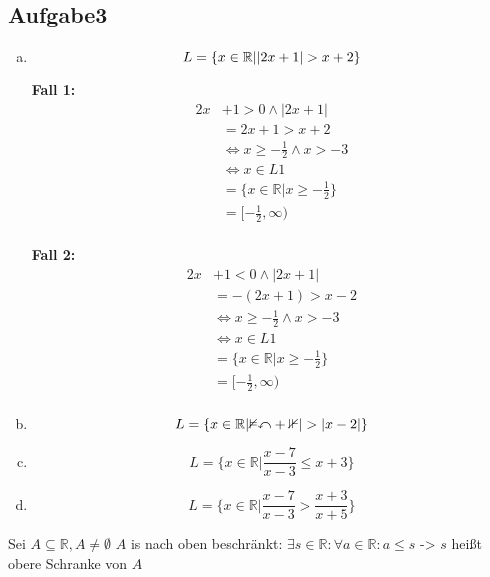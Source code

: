 \documentclass{article}
\begin{document}
\subsection*{Aufgabe3}

\begin{enumerate}[a)]
\item
  \[
    L = \{ x \in \mathbb{R} | \abs{2x + 1} > x + 2\}
  \]

  \begin{minipage}{.4\textwidth}
    \textbf{Fall 1:} \\
    \begin{align*}
      2x &+ 1 > 0 \land |2x+1|\\
         &= 2x+1 > x+2 \\
         &\iff x \geq -\frac{1}{2} \land x > -3 \\
         &\iff x \in L1 \\
         &= \{ x \in \mathbb{R} | x \geq -\frac{1}{2} \} \\
         &= [-\frac{1}{2}, \infty) \\
    \end{align*}
  \end{minipage}
  \hfill
  \vrule
  \hfill
  \begin{minipage}{.4\textwidth}
    \textbf{Fall 2:} \\
    \begin{align*}
      2x &+ 1 < 0 \land |2x  + 1| \\
         &= -(2x + 1) > x - 2 \\
         &\iff x \geq -\frac{1}{2} \land x > -3 \\
         &\iff x \in L1 \\
         &= \{ x \in \mathbb{R} | x \geq -\frac{1}{2} \} \\
         &= [-\frac{1}{2}, \infty) \\
    \end{align*}
  \end{minipage}
\item
  \[
    L = \{ x \in \mathbb{R\abs{2x + 1}} > \abs{x - 2} \}
  \]
\item
  \[
    L = \{ x \in \mathbb{R} | \frac{x-7}{x-3} \leq x + 3 \}
  \]

\item
  \[
    L = \{ x \in \mathbb{R} | \frac{x - 7}{x - 3} > \frac{x + 3}{x + 5} \}
  \]

\end{enumerate}

Sei $A \subseteq \mathbb{R}, A \ne \emptyset$ $A$ is nach oben beschränkt: $\exists s \in \mathbb{R} \colon \forall a \in \mathbb{R} \colon a \leq s$ -> $s$ heißt obere Schranke von $A$
\end{document}
